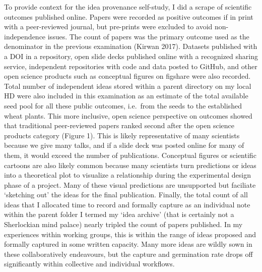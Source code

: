 \documentclass[]{elsarticle} %
\begin{document}
To provide context for the idea provenance self-study, I did a scrape of
scientific outcomes published online. Papers were recorded as positive
outcomes if in print with a peer-reviewed journal, but pre-prints were
excluded to avoid non-independence issues. The count of papers was the
primary outcome used as the denominator in the previous examination
(Kirwan 2017). Datasets published with a DOI in a repository, open slide
decks published online with a recognized sharing service, independent
repositories with code and data posted to GitHub, and other open science
products such as conceptual figures on figshare were also recorded.
Total number of independent ideas stored within a parent directory on my
local HD were also included in this examination as an estimate of the
total available seed pool for all these public outcomes, i.e.~from the
seeds to the established wheat plants. This more inclusive, open science
perspective on outcomes showed that traditional peer-reviewed papers
ranked second after the open science products category (Figure 1). This
is likely representative of many scientists because we give many talks,
and if a slide deck was posted online for many of them, it would exceed
the number of publications. Conceptual figures or scientific cartoons
are also likely common because many scientists turn predictions or ideas
into a theoretical plot to visualize a relationship during the
experimental design phase of a project. Many of these visual predictions
are unsupported but faciliate `sketching out' the ideas for the final
publication. Finally, the total count of all ideas that I allocated time
to record and formally capture as an individual note within the parent
folder I termed my `idea archive' (that is certainly not a Sherlockian
mind palace) nearly tripled the count of papers published. In my
experiences within working groups, this is within the range of ideas
proposed and formally captured in some written capacity. Many more ideas
are wildly sown in these collaboratively endeavours, but the capture and
germination rate drops off significantly within collective and
individual workflows.
\end{document}
